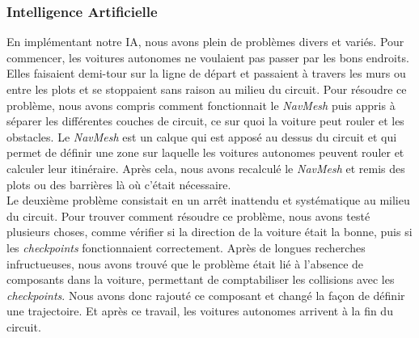 \documentclass[12pt,a4paper]{article}
\newcommand{\AI}{Intelligence Artificielle}
\begin{document}
            \subsubsection{\AI}
                En implémentant notre IA, nous avons plein de problèmes divers et variés. Pour 
                commencer, les voitures autonomes ne voulaient pas passer par les bons endroits. Elles 
                faisaient demi-tour sur la ligne de départ et passaient à travers les murs ou entre les 
                plots et se stoppaient sans raison au milieu du circuit. Pour résoudre ce problème, nous
                avons compris comment fonctionnait le \textsl{NavMesh} puis appris à séparer les 
                différentes couches de circuit, ce sur quoi la voiture peut rouler et les obstacles. Le 
                \textsl{NavMesh} est un calque qui est apposé au dessus du circuit et qui permet de
                définir une zone sur laquelle les voitures autonomes peuvent rouler et calculer leur
                itinéraire. Après cela, nous avons recalculé le \textsl{NavMesh} et remis des plots
                ou des barrières là où c'était nécessaire.\\
                Le deuxième problème consistait en un arrêt inattendu et systématique au milieu du 
                circuit. Pour trouver comment résoudre ce problème, nous avons testé plusieurs choses, 
                comme vérifier si la direction de la voiture était la bonne, puis si les 
                \textsl{checkpoints} fonctionnaient correctement. Après de longues recherches 
                infructueuses, nous avons trouvé que le problème était lié à l'absence de composants 
                dans la voiture, permettant de comptabiliser les collisions avec les 
                \textsl{checkpoints}. Nous avons donc rajouté ce composant et changé la façon de définir
                une trajectoire. Et après ce travail, les voitures autonomes arrivent à la fin du 
                circuit.
\end{document}
